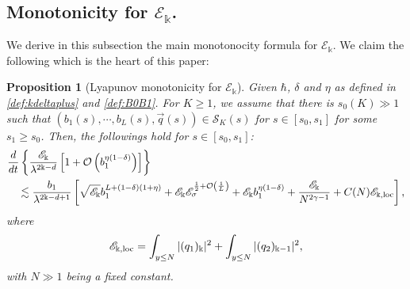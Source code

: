 \documentclass[11pt]{aims}
\newtheorem{proposition}[theorem]{Proposition}
\theoremstyle{definition}
\numberwithin{equation}{section}
\begin{document}
\subsection{Monotonicity for ${\mathscr{E}}_\Bbbk$.}

We derive in this subsection the main monotonocity formula for ${\mathscr{E}}_{\Bbbk}$. We claim the following which is the heart of this paper:

\begin{proposition}[Lyapunov monotonicity for ${\mathscr{E}}_{\Bbbk}$] \label{prop:E2k}Given $\hbar$, $\delta$ and $\eta$ as defined in \eqref{def:kdeltaplus} and \eqref{def:B0B1}. For $K \geq 1$, we assume that there is $s_0(K) \gg 1$ such that $(b_1(s), \cdots, b_L(s), \vec q(s)) \in {\mathcal{S}}_K(s)$ for $s \in [s_0, s_1]$ for some $s_1 \geq s_0$. Then, the followings hold for $s \in [s_0, s_1]$:
\begin{align}
&\frac{d}{dt}\left\{\frac{{\mathscr{E}}_{\Bbbk}}{\lambda^{2\Bbbk - d}}\left[1 + {\mathcal{O}}\left(b_1^{\eta(1-\delta)}\right) \right]\right\}\nonumber\\
&\quad \lesssim \frac{b_1}{\lambda^{2\Bbbk - d + 1}}\left[ \sqrt{{\mathscr{E}}_{\Bbbk}} b_1^{L + (1- \delta)(1 + \eta)} + {\mathscr{E}}_\Bbbk {\mathscr{E}}_\sigma^{\frac{1}{2} +{\mathcal{O}}\left(\frac 1L\right)}+ {\mathscr{E}}_\Bbbk b_1^{\eta(1-\delta)} +  \frac{{\mathscr{E}}_\Bbbk}{N^{2\gamma - 1}} + C(N){\mathscr{E}}_{\Bbbk, \textup{loc}} \right], \label{eq:Es2sLya}
\end{align}
where 
\begin{equation}\label{def:Ekloc}
{\mathscr{E}}_{\Bbbk, \textup{loc}} = \int_{y \leq N}|(q_1)_\Bbbk|^2 + \int_{y \leq N}|(q_2)_{\Bbbk - 1}|^2,
\end{equation}
with $N \gg 1$ being a fixed constant.
\end{proposition}
\end{document}
